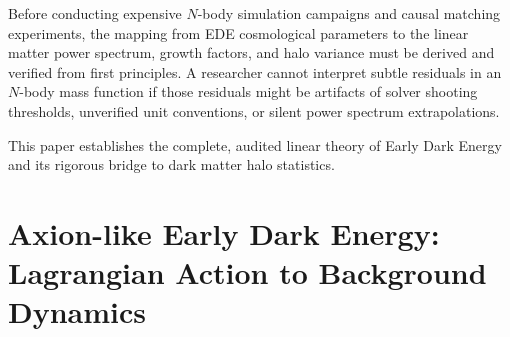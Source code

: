 \documentclass[11pt]{article}
\begin{document}
Before conducting expensive $N$-body simulation campaigns and causal matching experiments, the mapping from EDE cosmological parameters to the linear matter power spectrum, growth factors, and halo variance must be derived and verified from first principles. A researcher cannot interpret subtle residuals in an $N$-body mass function if those residuals might be artifacts of solver shooting thresholds, unverified unit conventions, or silent power spectrum extrapolations.

This paper establishes the complete, audited linear theory of Early Dark Energy and its rigorous bridge to dark matter halo statistics.

\section{Axion-like Early Dark Energy: Lagrangian Action to Background Dynamics}
\label{sec:scalar_dynamics}
\end{document}
